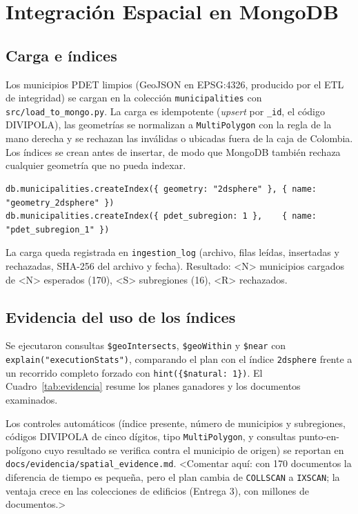 \section{Integración Espacial en MongoDB}

\subsection{Carga e índices}
Los municipios PDET limpios (GeoJSON en EPSG:4326, producido por el ETL de integridad) se cargan en la colección
\texttt{municipalities} con \texttt{src/load\_to\_mongo.py}. La carga es idempotente (\emph{upsert} por
\texttt{\_id}, el código DIVIPOLA), las geometrías se normalizan a \texttt{MultiPolygon} con la regla de la mano
derecha y se rechazan las inválidas o ubicadas fuera de la caja de Colombia. Los índices se crean antes de insertar,
de modo que MongoDB también rechaza cualquier geometría que no pueda indexar.

\begin{lstlisting}[style=lab,language=mongosh]
db.municipalities.createIndex({ geometry: "2dsphere" }, { name: "geometry_2dsphere" })
db.municipalities.createIndex({ pdet_subregion: 1 },    { name: "pdet_subregion_1" })
\end{lstlisting}

La carga queda registrada en \texttt{ingestion\_log} (archivo, filas leídas, insertadas y rechazadas, SHA-256 del
archivo y fecha). Resultado: <N> municipios cargados de <N> esperados (170), <S> subregiones (16), <R> rechazados.

\subsection{Evidencia del uso de los índices}
Se ejecutaron consultas \texttt{\$geoIntersects}, \texttt{\$geoWithin} y \texttt{\$near} con
\texttt{explain("executionStats")}, comparando el plan con el índice \texttt{2dsphere} frente a un recorrido
completo forzado con \texttt{hint(\{\$natural: 1\})}. El Cuadro~\ref{tab:evidencia} resume los planes ganadores y
los documentos examinados.

\begin{table}[!htbp]
\centering\small
\caption{Planes de ejecución de las consultas espaciales sobre \texttt{municipalities}.}
\label{tab:evidencia}
\end{table}

Los controles automáticos (índice presente, número de municipios y subregiones, códigos DIVIPOLA de cinco
dígitos, tipo \texttt{MultiPolygon}, y consultas punto-en-polígono cuyo resultado se verifica contra el municipio
de origen) se reportan en \texttt{docs/evidencia/spatial\_evidence.md}. <Comentar aquí: con 170 documentos la
diferencia de tiempo es pequeña, pero el plan cambia de \texttt{COLLSCAN} a \texttt{IXSCAN}; la ventaja crece en
las colecciones de edificios (Entrega 3), con millones de documentos.>

